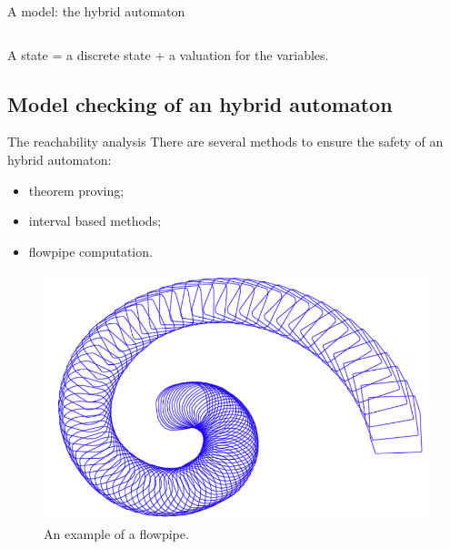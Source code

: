 \begin{frame}{A model: the hybrid automaton}
\begin{center}
\begin{columns}[c]
\begin{column}{5cm}
\hspace*{-0.5cm}
 \end{column}
 \begin{column}{5cm}
\end{column}
\end{columns}
A state = a discrete state + a valuation for the variables.
\end{center}

\end{frame}

\subsection{Model checking of an hybrid automaton}
\begin{frame}{The reachability analysis}
There are several methods to ensure the safety of an hybrid automaton:
\begin{itemize}
\item theorem proving;
\item interval based methods;
\item flowpipe computation.
\end{itemize}

\begin{figure}
\includegraphics[width=0.5\columnwidth]{images/zono.png}
An example of a flowpipe.
\end{figure}

\end{frame}

